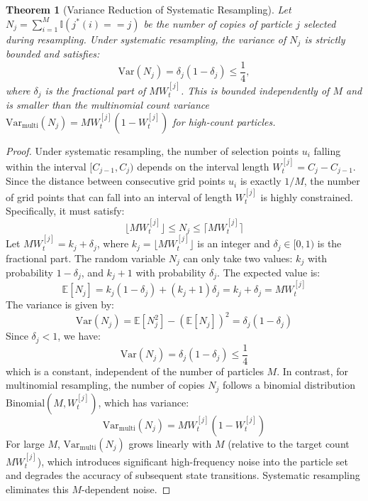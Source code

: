 \documentclass[11pt,a4paper]{report}
\newtheorem{theorem}{Theorem}
\begin{document}
\begin{theorem}[Variance Reduction of Systematic Resampling]
Let $N_j = \sum_{i=1}^M \mathbb{I}(j^*(i) == j)$ be the number of copies of particle $j$ selected during resampling. Under systematic resampling, the variance of $N_j$ is strictly bounded and satisfies:
\begin{equation}
    \text{Var}(N_j)=\delta_j(1-\delta_j)\le\frac{1}{4},
\end{equation}
where $\delta_j$ is the fractional part of $MW_t^{[j]}$. This is bounded independently of $M$ and is smaller than the multinomial count variance $\text{Var}_{\text{multi}}(N_j)=MW_t^{[j]}(1-W_t^{[j]})$ for high-count particles.
\end{theorem}

\begin{proof}
Under systematic resampling, the number of selection points $u_i$ falling within the interval $[C_{j-1}, C_j)$ depends on the interval length $W_t^{[j]} = C_j - C_{j-1}$. Since the distance between consecutive grid points $u_i$ is exactly $1/M$, the number of grid points that can fall into an interval of length $W_t^{[j]}$ is highly constrained. Specifically, it must satisfy:
\begin{equation}
    \lfloor M W_t^{[j]} \rfloor \le N_j \le \lceil M W_t^{[j]} \rceil
\end{equation}
Let $M W_t^{[j]} = k_j + \delta_j$, where $k_j = \lfloor M W_t^{[j]} \rfloor$ is an integer and $\delta_j \in [0, 1)$ is the fractional part. The random variable $N_j$ can only take two values: $k_j$ with probability $1 - \delta_j$, and $k_j + 1$ with probability $\delta_j$. The expected value is:
\begin{equation}
    \mathbb{E}[N_j] = k_j (1 - \delta_j) + (k_j + 1) \delta_j = k_j + \delta_j = M W_t^{[j]}
\end{equation}
The variance is given by:
\begin{equation}
    \text{Var}(N_j) = \mathbb{E}[N_j^2] - (\mathbb{E}[N_j])^2 = \delta_j (1 - \delta_j)
\end{equation}
Since $\delta_j < 1$, we have:
\begin{equation}
    \text{Var}(N_j) = \delta_j (1 - \delta_j) \le \frac{1}{4}
\end{equation}
which is a constant, independent of the number of particles $M$. In contrast, for multinomial resampling, the number of copies $N_j$ follows a binomial distribution $\text{Binomial}(M, W_t^{[j]})$, which has variance:
\begin{equation}
    \text{Var}_{\text{multi}}(N_j) = M W_t^{[j]} (1 - W_t^{[j]})
\end{equation}
For large $M$, $\text{Var}_{\text{multi}}(N_j)$ grows linearly with $M$ (relative to the target count $M W_t^{[j]}$), which introduces significant high-frequency noise into the particle set and degrades the accuracy of subsequent state transitions. Systematic resampling eliminates this $M$-dependent noise.
\end{proof}
\end{document}
